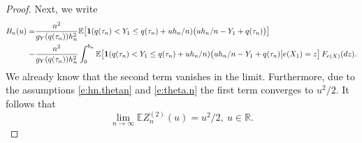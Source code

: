 \documentclass[12pt]{amsart}
\newcommand{\bbr}{\mathbb{R}}
\newcommand{\LFe}{F_{e(X)}}
\newcommand{\1}{\mathbbm{1}}
\newcommand{\0}{\mathbf{0}}
\newcommand{\one}{\mathbf{1}}
\newcommand{\E}{\mathbb{E}}
\theoremstyle{plain}
\theoremstyle{definition}
\begin{document}
\begin{proof}
Next, we write
\begin{align*} \label{e:mean.B.interm}
B_n(u) =& \frac{n^2}{g_Y(q(\tau_n))h_n^2}\E\bigl[  \one
  (q(\tau_n)<Y_1\leq q(\tau_n)+uh_n/n) \bigl(
  uh_n/n-Y_1+q(\tau_n)\bigr)\bigr]\\
\notag  -&
 \frac{n^2}{g_Y(q(\tau_n))h_n^2} \int_0^{b_n}  \E\bigl[  \one
  (q(\tau_n)<Y_1\leq q(\tau_n)+uh_n/n) \bigl( uh_n/n-Y_1+q(\tau_n)
   \big| e(X_1)=z\bigr]\, \LFe(dz). 
\end{align*}
%
We already know that the second term vanishes in the
limit. Furthermore, 
due to the assumptions  \eqref{e:hn.thetan} and \eqref{e:theta.n} the first term converges to $u^2/2$. 
It follows that
%
\begin{equation} \label{e:Zn2.mean.interm}
\lim_{n\to\infty}\E Z_n^{(2)}(u)= u^2/2, \ u\in\bbr.
\end{equation}


\end{proof}
\end{document}
